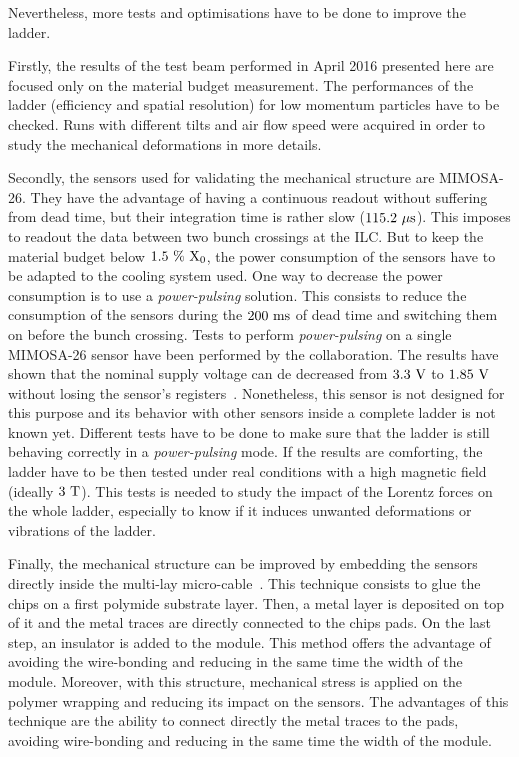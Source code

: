 Nevertheless, more tests and optimisations have to be done to improve the ladder.

Firstly, the results of the test beam performed in April 2016 presented here are focused only on the material budget measurement.
The performances of the ladder (efficiency and spatial resolution) for low momentum particles have to be checked.
Runs with different tilts and air flow speed were acquired in order to study the mechanical deformations in more details.

Secondly, the sensors used for validating the mechanical structure are \gls{MIMOSA}-26.
They have the advantage of having a continuous readout without suffering from dead time, but their integration time is rather slow ($115.2~\rm{\mu s}$).
This imposes to readout the data between two bunch crossings at the \gls{ILC}.
But to keep the material budget below $1.5~\%~\rm{X_{0}}$, the power consumption of the sensors have to be adapted to the cooling system used.
One way to decrease the power consumption is to use a \textit{power-pulsing} solution.
This consists to reduce the consumption of the sensors during the $200~\rm{ms}$ of dead time and switching them on before the bunch crossing.
Tests to perform \textit{power-pulsing} on a single \gls{MIMOSA}-26 sensor have been performed by the collaboration.
The results have shown that the nominal supply voltage can de decreased from $3.3~\rm{V}$ to $1.85~\rm{V}$ without losing the sensor's registers~\cite{Kuprash2013}.
Nonetheless, this sensor is not designed for this purpose and its behavior with other sensors inside a complete ladder is not known yet.
Different tests have to be done to make sure that the ladder is still behaving correctly in a \textit{power-pulsing} mode.
If the results are comforting, the ladder have to be then tested under real conditions with a high magnetic field (ideally $3~\rm{T}$).
This tests is needed to study the impact of the Lorentz forces on the whole ladder, especially to know if it induces unwanted deformations or vibrations of the ladder.

Finally, the mechanical structure can be improved by embedding the sensors directly inside the multi-lay micro-cable~\cite{Baudot2012}.
This technique consists to glue the chips on a first polymide substrate layer.
Then, a metal layer is deposited on top of it and the metal traces are directly connected to the chips pads.
On the last step, an insulator is added to the module.
This method offers the advantage of avoiding the wire-bonding and reducing in the same time the width of the module.
Moreover, with this structure, mechanical stress is applied on the polymer wrapping and reducing its impact on the sensors.
The advantages of this technique are the ability to connect directly the metal traces to the pads, avoiding wire-bonding and reducing in the same time the width of the module.

